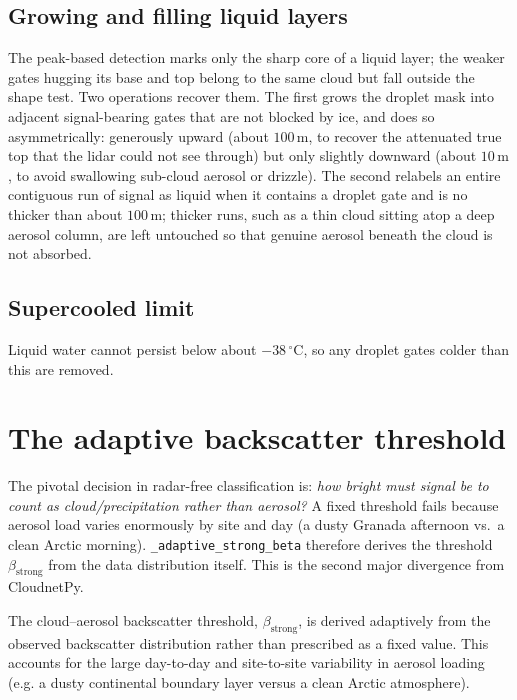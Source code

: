 \documentclass[11pt,a4paper]{article}
\newcommand{\degc}{\ensuremath{^\circ\mathrm{C}}}
\newcommand{\code}[1]{\texttt{#1}}
\begin{document}
\subsection{Growing and filling liquid layers}
\label{sec:grow}

The peak-based detection marks only the sharp core of a liquid layer; the weaker
gates hugging its base and top belong to the same cloud but fall outside the shape
test. Two operations recover them. The first grows the droplet mask into adjacent
signal-bearing gates that are not blocked by ice, and does so asymmetrically:
generously upward (about $100\,\mathrm{m}$, to recover the attenuated true top that
the lidar could not see through) but only slightly downward (about
$10\,\mathrm{m}$, to avoid swallowing sub-cloud aerosol or drizzle). The second
relabels an entire contiguous run of signal as liquid when it contains a droplet
gate and is no thicker than about $100\,\mathrm{m}$; thicker runs, such as a thin
cloud sitting atop a deep aerosol column, are left untouched so that genuine
aerosol beneath the cloud is not absorbed.

\subsection{Supercooled limit}

Liquid water cannot persist below about $-38\,\degc$, so any droplet gates colder
than this are removed.

\section{The adaptive backscatter threshold}
\label{sec:threshold}

The pivotal decision in radar-free classification is: \emph{how bright
must signal be to count as cloud/precipitation rather than aerosol?} A
fixed threshold fails because aerosol load varies enormously by site
and day (a dusty Granada afternoon vs.\ a clean Arctic
morning). \code{\_adaptive\_strong\_beta} therefore derives the
threshold $\beta_{\mathrm{strong}}$ from the data distribution itself.
This is the second major divergence from CloudnetPy.

The cloud--aerosol backscatter threshold, $\beta_{\mathrm{strong}}$,
is derived adaptively from the observed backscatter distribution
rather than prescribed as a fixed value. This accounts for the large
day-to-day and site-to-site variability in aerosol loading (e.g. a
dusty continental boundary layer versus a clean Arctic atmosphere).
\end{document}
